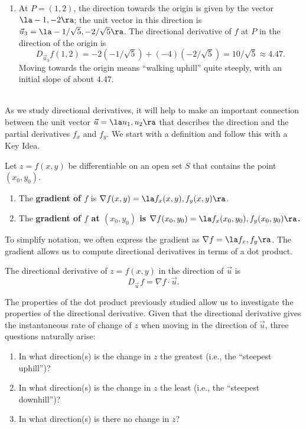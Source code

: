 {\begin{enumerate}
	Finding these directions of ``no elevation change'' is important.
	
	\item		At $P=(1,2)$, the direction towards the origin is given by the vector $\la -1,-2\ra$; the unit vector in this direction is $\vec u_3=\la -1/\sqrt{5},-2/\sqrt{5}\ra$. The directional derivative of $f$ at $P$ in the direction of the origin is
	\[
	D_{\vec u_3}f(1,2) = -2(-1/\sqrt{5}) + (-4)(-2/\sqrt{5}) = 10/\sqrt{5} \approx 4.47.
	\]
	Moving towards the origin means ``walking uphill'' quite steeply, with an initial slope of about $4.47$.
\end{enumerate}
\baselineskip
}\\

As we study directional derivatives, it will help to make an important connection between the unit vector $\vec u = \la u_1,u_2\ra$ that describes the direction and the partial derivatives $f_x$ and $f_y$. We start with a definition and follow this with a Key Idea.

{Let $z=f(x,y)$ be differentiable on an open set $S$ that contains the point $(x_0,y_0)$.
\begin{enumerate}
	\item The \textbf{gradient of $f$} is $\nabla f(x,y) = \la f_x(x,y),f_y(x,y)\ra$.
	\item The \textbf{gradient of $f$ at $(x_0,y_0)$ is $\nabla f(x_0,y_0) = \la f_x(x_0,y_0),f_y(x_0,y_0)\ra$.}
\end{enumerate}
}


To simplify notation, we often express the gradient as $\nabla f = \la f_x, f_y\ra$. The gradient allows us to compute directional derivatives in terms of a dot product.

{%
The directional derivative of $z=f(x,y)$ in the direction of $\vec u$ is
\[
D_{\vec u\,}f = \nabla f\cdot \vec u.
\]
}

The properties of the dot product previously studied allow us to investigate the properties of the directional derivative. Given that the directional derivative gives the instantaneous rate of change of $z$ when moving in the direction of $\vec u$, three questions naturally arise:
\begin{enumerate}
	\item In what direction(s) is the change in $z$ the greatest (i.e., the ``steepest uphill'')?
	\item In what direction(s) is the change in $z$ the least (i.e.,  the ``steepest downhill'')?
	\item In what direction(s) is there no change in $z$?
\end{enumerate}


